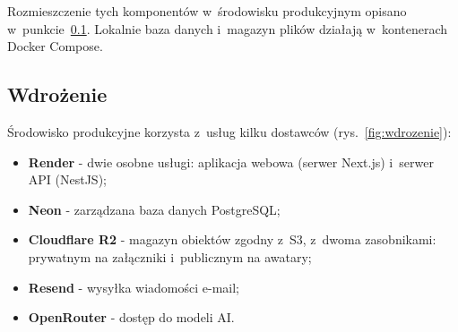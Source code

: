 Rozmieszczenie tych komponentów w~środowisku produkcyjnym opisano w~punkcie~\ref{sec:wdrozenie}. Lokalnie baza danych i~magazyn plików działają w~kontenerach Docker Compose.

\subsection{Wdrożenie}
\label{sec:wdrozenie}

Środowisko produkcyjne korzysta z~usług kilku dostawców (rys.~\ref{fig:wdrozenie}):

\begin{itemize}
  \item \textbf{Render} - dwie osobne usługi: aplikacja webowa (serwer Next.js) i~serwer API (NestJS);
  \item \textbf{Neon} - zarządzana baza danych PostgreSQL;
  \item \textbf{Cloudflare R2} - magazyn obiektów zgodny z~S3, z~dwoma zasobnikami: prywatnym na załączniki i~publicznym na awatary;
  \item \textbf{Resend} - wysyłka wiadomości e-mail;
  \item \textbf{OpenRouter} - dostęp do modeli AI.
\end{itemize}

